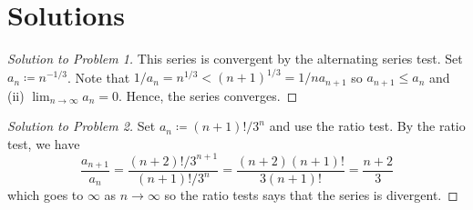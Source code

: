 \newpage
\section*{Solutions}
\begin{proof}[Solution to Problem 1]
This series is convergent by the alternating series test. Set $a_n\coloneqq
n^{-1/3}$. Note that $1/a_n=n^{1/3}<(n+1)^{1/3}=1/na_{n+1}$ so $a_{n+1}\leq
a_n$ and (ii) $\lim_{n\to\infty} a_n=0$. Hence, the series converges.
\end{proof}
\bigskip
\begin{proof}[Solution to Problem 2]
Set $a_n\coloneqq (n+1)!/3^n$ and use the ratio test. By the ratio test, we
have
\[
\frac{a_{n+1}}{a_n}=\frac{(n+2)!/3^{n+1}}{(n+1)!/3^{n}}=\frac{(n+2)(n+1)!}{3(n+1)!}=\frac{n+2}{3}
\]
which goes to $\infty$ as $n\to\infty$ so the ratio tests says that the
series is divergent.
\end{proof}

